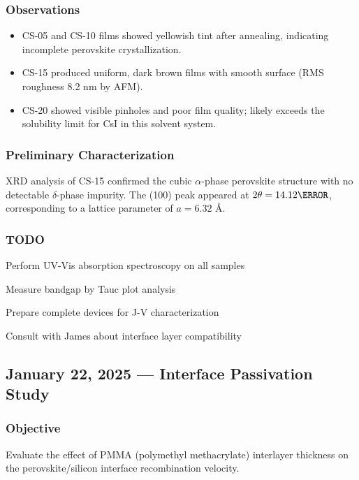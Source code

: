\documentclass[
    language=english,
    doctype=research-notebook,
    institution=none,
]{../../omnilatex}
\begin{document}
\subsubsection{Observations}
\begin{itemize}
    \item CS-05 and CS-10 films showed yellowish tint after annealing,
          indicating incomplete perovskite crystallization.
    \item CS-15 produced uniform, dark brown films with smooth surface
          (RMS roughness 8.2 nm by AFM).
    \item CS-20 showed visible pinholes and poor film quality; likely
          exceeds the solubility limit for CsI in this solvent system.
\end{itemize}

\subsubsection{Preliminary Characterization}
XRD analysis of CS-15 confirmed the cubic $\alpha$-phase perovskite
structure with no detectable $\delta$-phase impurity. The (100) peak
appeared at $2\theta = 14.12\degree$, corresponding to a lattice
parameter of $a = 6.32$ \AA.

\subsubsection{TODO}
\begin{todo}
    \item Perform UV-Vis absorption spectroscopy on all samples
    \item Measure bandgap by Tauc plot analysis
    \item Prepare complete devices for J-V characterization
    \item Consult with James about interface layer compatibility
\end{todo}

\subsection{January 22, 2025 --- Interface Passivation Study}
\label{entry:jan22}

\subsubsection{Objective}
Evaluate the effect of PMMA (polymethyl methacrylate) interlayer thickness
on the perovskite/silicon interface recombination velocity.
\end{document}
